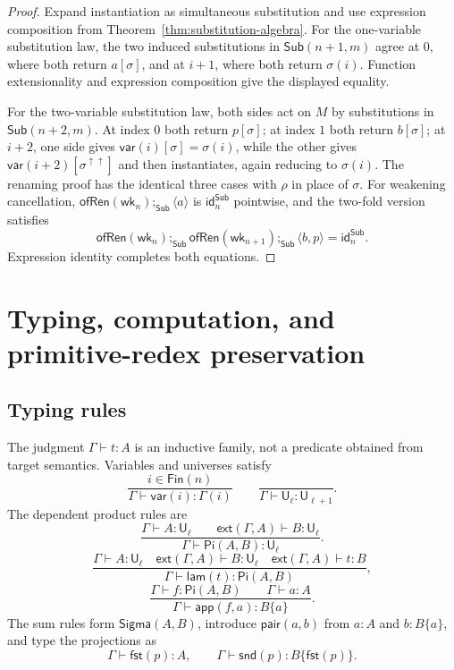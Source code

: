 \documentclass[10pt,reqno]{amsart}
\newcommand{\Fin}{\mathsf{Fin}}
\newcommand{\Ext}[2]{\mathsf{ext}(#1,#2)}
\newcommand{\Sub}{\mathsf{Sub}}
\newcommand{\Var}{\mathsf{var}}
\newcommand{\Sort}{\mathsf{U}}
\newcommand{\PiTy}{\mathsf{Pi}}
\newcommand{\SigmaTy}{\mathsf{Sigma}}
\newcommand{\Lam}{\mathsf{lam}}
\newcommand{\App}{\mathsf{app}}
\newcommand{\Pair}{\mathsf{pair}}
\newcommand{\Fst}{\mathsf{fst}}
\newcommand{\Snd}{\mathsf{snd}}
\newcommand{\idren}{\mathsf{id}}
\newcommand{\wk}{\mathsf{wk}}
\newcommand{\lift}{\uparrow}
\begin{document}
\begin{proof}
Expand instantiation as simultaneous substitution and use expression
composition from Theorem~\ref{thm:substitution-algebra}.  For the
one-variable substitution law, the two induced substitutions in
\(\Sub(n+1,m)\) agree at \(0\), where both return \(a[\sigma]\), and at
\(i+1\), where both return \(\sigma(i)\).  Function extensionality and
expression composition give the displayed equality.

For the two-variable substitution law, both sides act on \(M\) by substitutions in
\(\Sub(n+2,m)\).  At index \(0\) both return \(p[\sigma]\); at index \(1\)
both return \(b[\sigma]\); at \(i+2\), one side gives
\(\Var(i)[\sigma]=\sigma(i)\), while the other gives
\(\Var(i+2)[\sigma^{\lift\lift}]\) and then instantiates, again reducing to
\(\sigma(i)\).  The renaming proof has the identical three cases with
\(\rho\) in place of \(\sigma\).  For weakening cancellation,
\(\mathsf{ofRen}(\wk_n);_{\Sub}\langle a\rangle\) is
\(\idren^{\Sub}_n\) pointwise, and the two-fold version satisfies
\[
\mathsf{ofRen}(\wk_n);_{\Sub}
\mathsf{ofRen}(\wk_{n+1});_{\Sub}\langle b,p\rangle
 =\idren^{\Sub}_n.
\]
Expression identity completes both equations.
\end{proof}

\section{Typing, computation, and primitive-redex preservation}
\label{sec:judgments}

\subsection{Typing rules}

The judgment \(\Gamma\vdash t:A\) is an inductive family, not a predicate
obtained from target semantics.  Variables and universes satisfy
\[
 \frac{i\in\Fin(n)}{\Gamma\vdash\Var(i):\Gamma(i)}
 \qquad
 \frac{}{\Gamma\vdash\Sort_\ell:\Sort_{\ell+1}}.
\]
The dependent product rules are
\[
\frac{\Gamma\vdash A:\Sort_\ell\qquad
      \Ext{\Gamma}{A}\vdash B:\Sort_\ell}
     {\Gamma\vdash\PiTy(A,B):\Sort_\ell}.
\]
\[
\frac{\Gamma\vdash A:\Sort_\ell\quad
      \Ext{\Gamma}{A}\vdash B:\Sort_\ell\quad
      \Ext{\Gamma}{A}\vdash t:B}
     {\Gamma\vdash\Lam(t):\PiTy(A,B)},
\]
\[
\frac{\Gamma\vdash f:\PiTy(A,B)\qquad\Gamma\vdash a:A}
     {\Gamma\vdash\App(f,a):B\{a\}}.
\]
The sum rules form \(\SigmaTy(A,B)\), introduce
\(\Pair(a,b)\) from \(a:A\) and \(b:B\{a\}\), and type the projections as
\[
  \Gamma\vdash\Fst(p):A,\qquad
  \Gamma\vdash\Snd(p):B\{\Fst(p)\}.
\]
\end{document}
